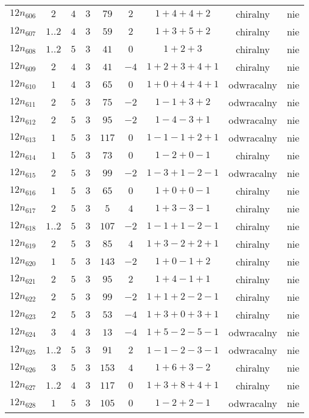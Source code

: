 \begin{longtable}{ccccccccc}
$12n_{606}$ & $2$ & $4$ & $3$ & $79$ & $2$ & $1+4+4+2$ & chiralny & nie \\
$12n_{607}$ & $1..2$ & $4$ & $3$ & $59$ & $2$ & $1+3+5+2$ & chiralny & nie \\
$12n_{608}$ & $1..2$ & $5$ & $3$ & $41$ & $0$ & $1+2+3$ & chiralny & nie \\
$12n_{609}$ & $2$ & $4$ & $3$ & $41$ & $-4$ & $1+2+3+4+1$ & chiralny & nie \\
$12n_{610}$ & $1$ & $4$ & $3$ & $65$ & $0$ & $1+0+4+4+1$ & odwracalny & nie \\
$12n_{611}$ & $2$ & $5$ & $3$ & $75$ & $-2$ & $1-1+3+2$ & odwracalny & nie \\
$12n_{612}$ & $2$ & $5$ & $3$ & $95$ & $-2$ & $1-4-3+1$ & odwracalny & nie \\
$12n_{613}$ & $1$ & $5$ & $3$ & $117$ & $0$ & $1-1-1+2+1$ & odwracalny & nie \\
$12n_{614}$ & $1$ & $5$ & $3$ & $73$ & $0$ & $1-2+0-1$ & chiralny & nie \\
$12n_{615}$ & $2$ & $5$ & $3$ & $99$ & $-2$ & $1-3+1-2-1$ & odwracalny & nie \\
$12n_{616}$ & $1$ & $5$ & $3$ & $65$ & $0$ & $1+0+0-1$ & chiralny & nie \\
$12n_{617}$ & $2$ & $5$ & $3$ & $5$ & $4$ & $1+3-3-1$ & chiralny & nie \\
$12n_{618}$ & $1..2$ & $5$ & $3$ & $107$ & $-2$ & $1-1+1-2-1$ & chiralny & nie \\
$12n_{619}$ & $2$ & $5$ & $3$ & $85$ & $4$ & $1+3-2+2+1$ & chiralny & nie \\
$12n_{620}$ & $1$ & $5$ & $3$ & $143$ & $-2$ & $1+0-1+2$ & chiralny & nie \\
$12n_{621}$ & $2$ & $5$ & $3$ & $95$ & $2$ & $1+4-1+1$ & chiralny & nie \\
$12n_{622}$ & $2$ & $5$ & $3$ & $99$ & $-2$ & $1+1+2-2-1$ & chiralny & nie \\
$12n_{623}$ & $2$ & $5$ & $3$ & $53$ & $-4$ & $1+3+0+3+1$ & chiralny & nie \\
$12n_{624}$ & $3$ & $4$ & $3$ & $13$ & $-4$ & $1+5-2-5-1$ & odwracalny & nie \\
$12n_{625}$ & $1..2$ & $5$ & $3$ & $91$ & $2$ & $1-1-2-3-1$ & odwracalny & nie \\
$12n_{626}$ & $3$ & $5$ & $3$ & $153$ & $4$ & $1+6+3-2$ & chiralny & nie \\
$12n_{627}$ & $1..2$ & $4$ & $3$ & $117$ & $0$ & $1+3+8+4+1$ & chiralny & nie \\
$12n_{628}$ & $1$ & $5$ & $3$ & $105$ & $0$ & $1-2+2-1$ & odwracalny & nie \\

\end{longtable}
